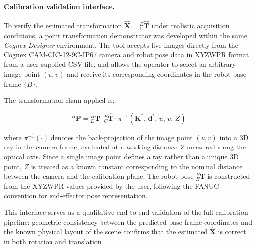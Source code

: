 \paragraph{Calibration validation interface.}
To verify the estimated transformation $\hat{\mathbf{X}} = {}^E_C\hat{\mathbf{T}}$
under realistic acquisition conditions, a point transformation demonstrator
was developed within the same \textit{Cognex Designer} environment. The tool
accepts live images directly from the Cognex CAM-CIC-12-9C-IP67 camera and
robot pose data in XYZWPR format from a user-supplied CSV file, and allows
the operator to select an arbitrary image point $(u, v)$ and receive its
corresponding coordinates in the robot base frame $\{B\}$.

The transformation chain applied is:

\begin{equation}
	{}^B\mathbf{P} =
	{}^B_E\mathbf{T} \cdot {}^E_C\hat{\mathbf{T}} \cdot
	\pi^{-1}\!\left(\mathbf{K}^*,\, \mathbf{d}^*,\, u,\, v,\, Z\right)
	\label{eq:pixel_to_base}
\end{equation}

\noindent where $\pi^{-1}(\cdot)$ denotes the back-projection of the image
point $(u,v)$ into a 3D ray in the camera frame, evaluated at a working
distance $Z$ measured along the optical axis. Since a single image point
defines a ray rather than a unique 3D point, $Z$ is treated as a known
constant corresponding to the nominal distance between the camera and the
calibration plane. The robot pose ${}^B_E\mathbf{T}$ is constructed from
the XYZWPR values provided by the user, following the FANUC convention for
end-effector pose representation.

This interface serves as a qualitative end-to-end validation of the full
calibration pipeline: geometric consistency between the predicted base-frame
coordinates and the known physical layout of the scene confirms that the
estimated $\hat{\mathbf{X}}$ is correct in both rotation and translation.

